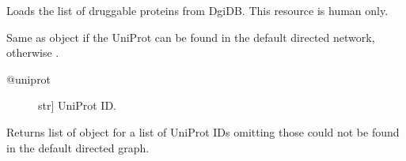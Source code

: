 \documentclass[letterpaper,10pt,english]{sphinxmanual}
\begin{document}
\begin{fulllineitems}
\begin{fulllineitems}
\begin{description}
\end{description}

\end{fulllineitems}


\begin{fulllineitems}
\label{\detokenize{main:pypath.main.PyPath.dproteins}}
\end{fulllineitems}


\begin{fulllineitems}
\label{\detokenize{main:pypath.main.PyPath.dps}}
\end{fulllineitems}


\begin{fulllineitems}
\label{\detokenize{main:pypath.main.PyPath.druggability_list}}
Loads the list of druggable proteins from DgiDB. This resource
is human only.

\end{fulllineitems}


\begin{fulllineitems}
\label{\detokenize{main:pypath.main.PyPath.duniprot}}
Same as  object if the UniProt
can be found in the default directed network,
otherwise .
\begin{description}
\item[{@uniprot}] \leavevmode{[}str{]}
UniProt ID.

\end{description}

\end{fulllineitems}


\begin{fulllineitems}
\label{\detokenize{main:pypath.main.PyPath.duniprots}}
Returns list of  object
for a list of UniProt IDs omitting those
could not be found in the default
directed graph.


\end{fulllineitems}
\end{fulllineitems}
\end{document}
